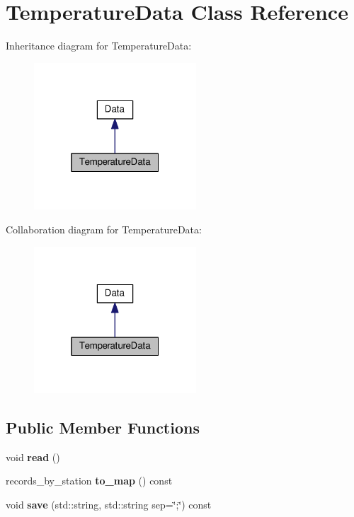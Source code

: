 \hypertarget{classTemperatureData}{}\section{Temperature\+Data Class Reference}
\label{classTemperatureData}


Inheritance diagram for Temperature\+Data\+:\nopagebreak
\begin{figure}[H]
\begin{center}
\leavevmode
\includegraphics[width=172pt]{classTemperatureData__inherit__graph}
\end{center}
\end{figure}


Collaboration diagram for Temperature\+Data\+:\nopagebreak
\begin{figure}[H]
\begin{center}
\leavevmode
\includegraphics[width=172pt]{classTemperatureData__coll__graph}
\end{center}
\end{figure}
\subsection*{Public Member Functions}
\begin{DoxyCompactItemize}
\item 
void {\bfseries read} ()\hypertarget{classTemperatureData_ac481b4de9ca185ac241f991d954c5794}{}\label{classTemperatureData_ac481b4de9ca185ac241f991d954c5794}

\item 
records\+\_\+by\+\_\+station {\bfseries to\+\_\+map} () const \hypertarget{classTemperatureData_a3c6e7348c016f1521a1516f6d90387f8}{}\label{classTemperatureData_a3c6e7348c016f1521a1516f6d90387f8}

\item 
void {\bfseries save} (std\+::string, std\+::string sep=\char`\"{};\char`\"{}) const \hypertarget{classTemperatureData_a5360404200e4daa1643dcca45badae28}{}\label{classTemperatureData_a5360404200e4daa1643dcca45badae28}

\end{DoxyCompactItemize}
